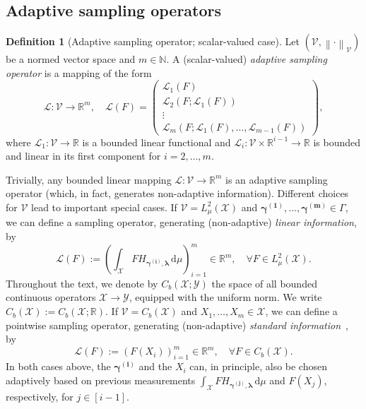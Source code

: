 \documentclass[namedate,webpdf]{ima-authoring-template-blank}
\def\D{\,\mathrm{d}}
\newcommand*{\nm}[1]{{\left\|#1\right \|}}
\newcounter{counter}
\numberwithin{counter}{section}
\numberwithin{equation}{section}
\theoremstyle{plain}
\theoremstyle{definition}
\newtheorem{definition}[counter]{Definition}
\newcommand*{\cL}{\mathcal{L}}
\newcommand*{\cV}{\mathcal{V}}
\newcommand*{\cX}{\mathcal{X}}
\newcommand*{\cY}{\mathcal{Y}}
\newcommand*{\bbN}{\mathbb{N}}
\newcommand*{\bbR}{\mathbb{R}}
\theoremstyle{thmstyletwo}
\begin{document}
\subsection{Adaptive sampling operators}

\begin{definition}[{Adaptive sampling operator; scalar-valued case}]
\label{def: adaptive sampling operator; scalar-valued}
    Let \((\cV,\nm{\cdot}_\cV)\) be a normed vector space and \(m\in\bbN\). A (scalar-valued) \emph{adaptive sampling operator} is a mapping of the form 
    \[
    \cL: \cV \to \bbR^m, \quad \cL(F) = 
    \begin{pmatrix}
        \cL_1(F) \\
        \cL_2(F; \cL_1(F))\\
        \vdots\\
        \cL_m(F; \cL_1(F), \dots, \cL_{m-1}(F))
    \end{pmatrix},
    \]
    where \(\cL_1: \cV \to \bbR\) is a bounded linear functional and \(\cL_i: \cV \times \bbR^{i-1} \to \bbR\) is bounded and linear in its first component for \(i = 2, \dots, m\).
\end{definition}

Trivially, any bounded linear mapping \(\cL: \cV \to \bbR^m\) is an adaptive sampling operator (which, in fact, generates non-adaptive information).
Different choices for \(\cV\) lead to important special cases. If \(\cV = L_{\mu}^2(\cX)\) and \(\bm{\gamma}^{\bm{(1)}}, \dots, \bm{\gamma}^{\bm{(m)}} \in \Gamma\), we can define a sampling operator, generating (non-adaptive) \emph{linear information}, by
\begin{equation}
\label{eq: adaptive sampling: linear sampling operator}
    \cL(F) := \left(\int_{\cX} F H_{\bm{\gamma}^{\bm{(i)}}, \bm{\lambda}} \D \mu \right)_{i = 1}^m \in \bbR^m, \quad \forall F \in L_{\mu}^2(\cX).
\end{equation}
Throughout the text, we denote by \( C_b(\cX; \cY) \) the space of all bounded continuous operators \( \cX \to \cY \), equipped with the uniform norm. We write \(C_b(\cX) := C_b(\cX; \bbR) \). If \(\cV = C_b(\cX)\) and \(X_1, \dots, X_m \in \cX\), we can define a pointwise sampling operator, generating (non-adaptive) \emph{standard information}~\citep[Ch. 4.1.1]{novak_TractabilityMultivariateProblemsVolume_2008}, by
\begin{equation}
\label{eq: adaptive sampling: pointwise sampling operator}
    \cL(F) := \left(F(X_i)\right)_{i = 1}^m \in \bbR^m, \quad \forall F \in C_b(\cX).
\end{equation}
In both cases above, the \(\bm{\gamma}^{\bm{(i)}}\) and the \(X_i\) can, in principle, also be chosen adaptively based on previous measurements \(\int_{\cX} F H_{\bm{\gamma}^{\bm{(j)}}, \bm{\lambda}} \D \mu\) and \(F(X_j)\), respectively, for \(j \in [i-1]\).
\end{document}
